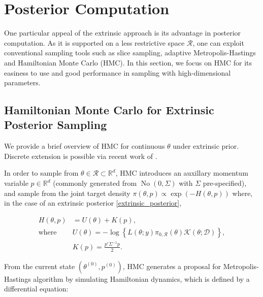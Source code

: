 \documentclass[10pt]{article}
\newcommand{\mc}[1]{\mathcal{#1}}
\DeclareMathOperator{\No}{No}
\DeclareMathOperator{\1}{\mathbbm{1}}
\begin{document}
\section{Posterior Computation}

One particular appeal of the extrinsic approach is its advantage in posterior computation. As it is supported on a less restrictive space $\mc R$, one can exploit conventional sampling tools such as slice sampling, adaptive Metropolis-Hastings and Hamiltonian Monte Carlo (HMC). In this section, we focus on HMC for its easiness to use and good performance in sampling with high-dimensional parameters.

\subsection{Hamiltonian Monte Carlo for Extrinsic Posterior Sampling}

We provide a brief overview of HMC for continuous $\theta$ under extrinsic prior. Discrete extension is possible via recent work of \cite{nishimura2017discontinuous}.

In order to sample from $\theta\in\mc R \subset \mathbb R^d$, HMC introduces an auxillary momentum variable $p\in \mathbb R^d$ (commonly generated from $\No(0, \Sigma)$ with $\Sigma$ pre-specified), and sample from the joint target density $\pi(\theta, p) \propto \exp (- H(\theta, p))$ where, in the case of an extrinsic posterior \eqref{extrinsic_posterior}, 


\begin{equation}
\begin{aligned}
H(\theta, p)& = U(\theta)+K(p),\\
\text{where } & U(\theta) = -\log\left\{ L(\theta;y)\pi_{0,\mc R}(\theta) \mc{K}(\theta;\mc D) \right\},\\
& K(p) = \frac{p'\Sigma^{-1} p}{2}.
\end{aligned}
\end{equation}

From the current state $(\theta^{(0)},p^{(0)})$, HMC generates a proposal for Metropolis-Hastings algorithm by simulating Hamiltonian dynamics, which is defined by a differential equation:
\end{document}
